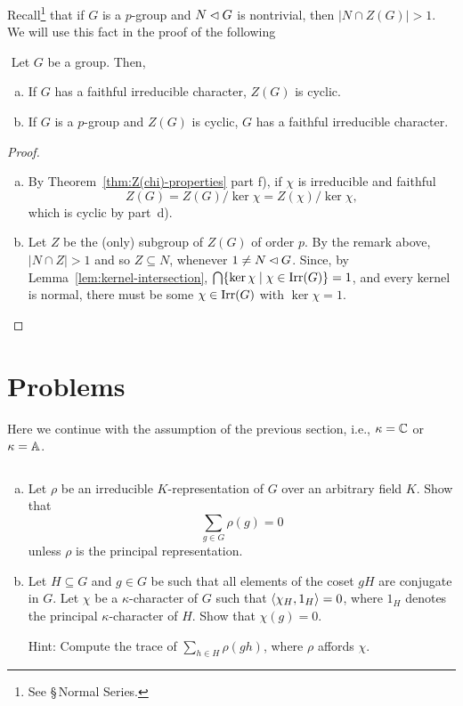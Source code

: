 \begin{rem}
    Recall\footnote{See \cite{LC-groups} \S\,Normal Series.} that if $G$ is a $p$-group and $N\lhd G$ is nontrivial, then $|N\cap Z(G)|>1$. We will use this fact in the proof of the following
\end{rem}

\begin{thm}${}$ Let $G$ be a group. Then,
    \begin{enumerate}[a),font=\upshape]
        \item If\/ $G$ has a faithful irreducible character, $Z(G)$ is cyclic.

        \item If\/ $G$ is a\/ $p$-group and\/ $Z(G)$ is cyclic, $G$ has a faithful irreducible character.
    \end{enumerate}
\end{thm}

\begin{proof}${}$
    \begin{enumerate}[a)]
        \item By Theorem~\ref{thm:Z(chi)-properties} part f), if $\chi$ is irreducible and faithful
        $$
            Z(G)=Z(G)/\ker\chi=Z(\chi)/\ker\chi,
        $$
        which is cyclic by part~d).

        \item Let $Z$ be the (only) subgroup of $Z(G)$ of order $p$. By the remark above, $|N\cap Z|>1$ and so  $Z\subseteq N$, whenever $1\ne N\lhd G$. Since, by Lemma~\ref{lem:kernel-intersection}, $\bigcap\{\ker\chi\mid\chi\in\operatorname{Irr}(G)\}=1$, and every kernel is normal, there must be some $\chi\in\operatorname{Irr}(G)$ with $\ker\chi=1$.
    \end{enumerate}
\end{proof}

\section{Problems} Here we continue with the assumption of the previous section, i.e., $\kappa=\mathbb{C}$ or $\kappa=\mathbb{A}$.

\begin{probl}${}$
    \begin{enumerate}[a),font=\upshape]
        \item Let\/ $\rho$ be an irreducible\/ $K$-representation of\/ $G$ over an arbitrary field\/ $K$. Show that 
        $$
            \sum_{g\in G}\rho(g) = 0
        $$
        unless\/ $\rho$ is the principal representation.
    
        \item Let\/ $H\subseteq G$ and\/ $g\in G$ be such that all elements of the coset\/ $gH$ are conjugate in\/ $G$. Let\/ $\chi$ be a\/ $\kappa$-character of\/ $G$ such that\/ $\langle\chi_H,1_H\rangle=0$, where\/ $1_H$ denotes the principal\/ $\kappa$-character of\/ $H$. Show that\/ $\chi(g)=0$.
    
        \textrm{\rm Hint: Compute the trace of $\sum_{h \in H} \rho(gh)$, where $\rho$ affords $\chi$.}
    \end{enumerate}
\end{probl}


